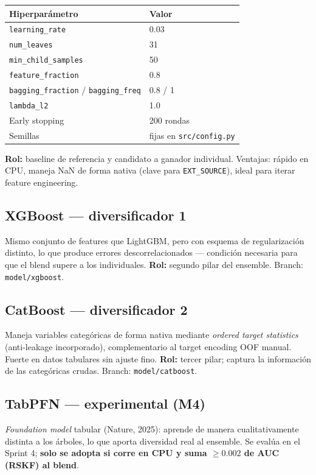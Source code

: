 \documentclass[11pt,a4paper]{article}
\begin{document}
\begin{table}[h]
\centering
\begin{tabular}{ll}
\toprule
\textbf{Hiperpar\'ametro} & \textbf{Valor} \\
\midrule
\texttt{learning\_rate} & 0.03 \\
\texttt{num\_leaves} & 31 \\
\texttt{min\_child\_samples} & 50 \\
\texttt{feature\_fraction} & 0.8 \\
\texttt{bagging\_fraction} / \texttt{bagging\_freq} & 0.8 / 1 \\
\texttt{lambda\_l2} & 1.0 \\
Early stopping & 200 rondas \\
Semillas & fijas en \texttt{src/config.py} \\
\bottomrule
\end{tabular}
\end{table}

\noindent\textbf{Rol:} baseline de referencia y candidato a ganador individual.
Ventajas: r\'apido en CPU, maneja NaN de forma nativa (clave para
\texttt{EXT\_SOURCE}), ideal para iterar feature engineering.

\subsection{XGBoost --- diversificador 1}
Mismo conjunto de features que LightGBM, pero con esquema de regularizaci\'on
distinto, lo que produce errores descorrelacionados --- condici\'on necesaria
para que el blend supere a los individuales. \textbf{Rol:} segundo pilar del
ensemble. Branch: \texttt{model/xgboost}.

\subsection{CatBoost --- diversificador 2}
Maneja variables categ\'oricas de forma nativa mediante \emph{ordered target
statistics} (anti-leakage incorporado), complementario al target encoding OOF
manual. Fuerte en datos tabulares sin ajuste fino. \textbf{Rol:} tercer pilar;
captura la informaci\'on de las categ\'oricas crudas. Branch:
\texttt{model/catboost}.

\subsection{TabPFN --- experimental (M4)}
\emph{Foundation model} tabular (Nature, 2025): aprende de manera
cualitativamente distinta a los \'arboles, lo que aporta diversidad real al
ensemble. Se eval\'ua en el Sprint 4; \textbf{solo se adopta si corre en CPU y
suma $\geq 0.002$ de AUC (RSKF) al blend}.
\end{document}
